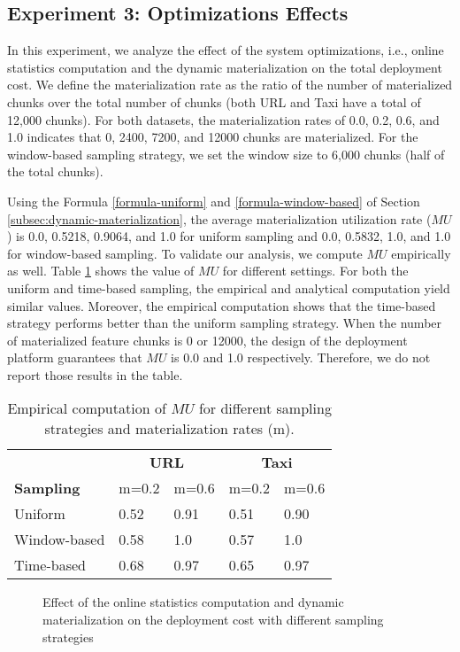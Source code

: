 \subsection{Experiment 3: Optimizations Effects}
In this experiment, we analyze the effect of the system optimizations, i.e., online statistics computation and the dynamic materialization on the total deployment cost.
We define the materialization rate as the ratio of the number of materialized chunks over the total number of chunks (both URL and Taxi have a total of 12,000 chunks).
For both datasets, the materialization rates of 0.0, 0.2, 0.6, and 1.0 indicates that 0, 2400, 7200, and 12000 chunks are materialized.
For the window-based sampling strategy, we set the window size to 6,000 chunks (half of the total chunks).

Using the Formula \ref{formula-uniform} and \ref{formula-window-based} of Section \ref{subsec:dynamic-materialization}, the average materialization utilization rate ($MU$) is 0.0, 0.5218, 0.9064, and 1.0 for uniform sampling and 0.0, 0.5832, 1.0, and 1.0 for window-based sampling.
To validate our analysis, we compute $MU$ empirically as well.
Table \ref{table-empirical-mu} shows the value of $MU$ for different settings.
For both the uniform and time-based sampling, the empirical and analytical computation yield similar values.
Moreover, the empirical computation shows that the time-based strategy performs better than the uniform sampling strategy.
When the number of materialized feature chunks is 0 or 12000, the design of the deployment platform guarantees that $MU$ is 0.0 and 1.0 respectively. 
Therefore, we do not report those results in the table.
\begin{table}[!h]
 \vspace{-9pt}
\begin{tabular}{lllll}
\hline
& \multicolumn{2}{c}{\textbf{URL}}  & \multicolumn{2}{c}{\textbf{Taxi}} \\
 \cmidrule(lr){2-3} \cmidrule(lr){4-5} 
\textbf{Sampling}  & \multicolumn{1}{l}{m=0.2} & \multicolumn{1}{l}{m=0.6} 
 &  \multicolumn{1}{l}{m=0.2} & \multicolumn{1}{l}{m=0.6}  \\
\hline
Uniform      	&  0.52 & 0.91 & 0.51 & 0.90 \\
Window-based &  0.58 	& 1.0 & 0.57 & 1.0 \\
Time-based &   0.68 	&  0.97 & 0.65 & 0.97 \\ \hline      
\end{tabular}
\caption{Empirical computation of $MU$ for different sampling strategies and materialization rates (m).}
 \vspace{-15pt}
\label{table-empirical-mu}
\end{table}
\begin{figure}[!h]
\centering
\resizebox{\columnwidth}{!}{}
\caption{Effect of the online statistics computation and dynamic materialization on the deployment cost with different sampling strategies}
 \vspace{-20pt}
\label{fig-optimization-effect}
\end{figure}

